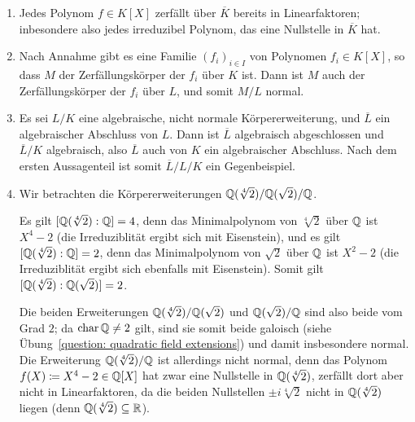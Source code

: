 \begin{solution}
  \begin{enumerate}
    \item
      Jedes Polynom $f \in K[X]$ zerfällt über $\overline{K}$ bereits in Linearfaktoren;
      inbesondere also jedes irreduzibel Polynom, das eine Nullstelle in $\overline{K}$ hat.
      
    \item
      Nach Annahme gibt es eine Familie $(f_i)_{i \in I}$ von Polynomen $f_i \in K[X]$, so dass $M$ der Zerfällungskörper der $f_i$ über $K$ ist.
      Dann ist $M$ auch der Zerfällungskörper der $f_i$ über $L$, und somit $M/L$ normal.
      
    \item
      Es sei $L/K$ eine algebraische, nicht normale Körpererweiterung, und $\overline{L}$ ein algebraischer Abschluss von $L$.
      Dann ist $\overline{L}$ algebraisch abgeschlossen und $\overline{L}/K$ algebraisch, also $\overline{L}$ auch von $K$ ein algebraischer Abschluss.
      Nach dem ersten Aussagenteil ist somit $\overline{L}/L/K$ ein Gegenbeispiel.
      
    \item
      Wir betrachten die Körpererweiterungen $\mathbb{Q}(\sqrt[4]{2}) / \mathbb{Q}(\sqrt{2}) / \mathbb{Q}$.
      
      Es gilt $[\mathbb{Q}(\sqrt[4]{2}) : \mathbb{Q}] = 4$, denn das Minimalpolynom von $\sqrt[4]{2}$ über $\mathbb{Q}$ ist $X^4 - 2$ (die Irreduziblität ergibt sich mit Eisenstein), und es gilt $[\mathbb{Q}(\sqrt[4]{2}) : \mathbb{Q}] = 2$, denn das Minimalpolynom von $\sqrt{2}$ über $\mathbb{Q}$ ist $X^2 - 2$ (die Irreduziblität ergibt sich ebenfalls mit Eisenstein).
      Somit gilt $[\mathbb{Q}(\sqrt[4]{2}) : \mathbb{Q}(\sqrt{2})] = 2$.
      
      Die beiden Erweiterungen $\mathbb{Q}(\sqrt[4]{2}) / \mathbb{Q}(\sqrt{2})$ und $\mathbb{Q}(\sqrt{2}) / \mathbb{Q}$ sind also beide vom Grad $2$;
      da $\operatorname{char} \mathbb{Q} \neq 2$ gilt, sind sie somit beide galoisch (siehe Übung~\ref{question: quadratic field extensions}) und damit insbesondere normal.
      Die Erweiterung $\mathbb{Q}(\sqrt[4]{2}) / \mathbb{Q}$ ist allerdings nicht normal, denn das Polynom $f(X) \coloneqq X^4 - 2 \in \mathbb{Q}[X]$ hat zwar eine Nullstelle in $\mathbb{Q}(\sqrt[4]{2})$, zerfällt dort aber nicht in Linearfaktoren, da die beiden Nullstellen $\pm i \sqrt[4]{2}$ nicht in $\mathbb{Q}(\sqrt[4]{2})$ liegen (denn $\mathbb{Q}(\sqrt[4]{2}) \subseteq \mathbb{R}$).
  \end{enumerate}
\end{solution}



